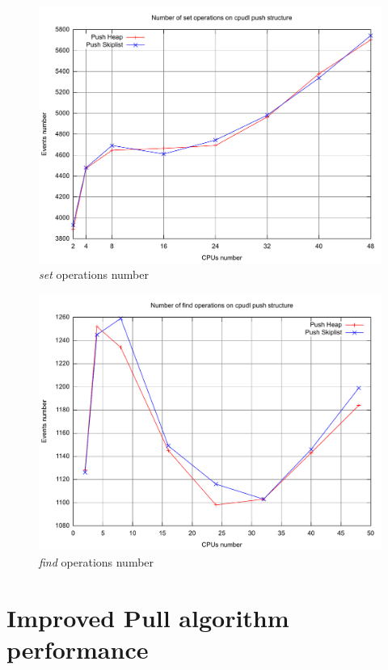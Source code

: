 \begin{figure}[htbp]
    \includegraphics[width=\columnwidth]{images/heap_skiplist_nr_push_set}
    \caption{\emph{set} operations number}
    \label{fig:heap_skiplist_nr_set}
\end{figure}

\begin{figure}[htbp]
    \includegraphics[width=\columnwidth]{images/heap_skiplist_nr_push_find}
    \caption{\emph{find} operations number}
    \label{fig:heap_skiplist_nr_find}
\end{figure}

\section{Improved Pull algorithm performance\label{sec:improved_pull_perf}}

